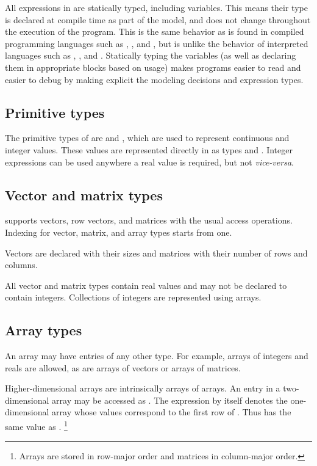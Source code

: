 \documentclass[article]{jss}
\begin{document}
All expressions in  are statically typed, including
variables.  This means their type is declared at compile time as part
of the model, and does not change throughout the execution of the
program.  This is the same behavior as is found in compiled
programming languages such as , ,
and , but is unlike the behavior of interpreted
languages such as , , and
.  Statically typing the variables (as well as
declaring them in appropriate blocks based on usage) makes
 programs easier to read and easier to debug by making
explicit the modeling decisions and expression types.

\subsection{Primitive types}

The primitive types of  are  and ,
which are used to represent continuous and integer values.  These
values are represented directly in  as types
 and .  Integer expressions can be used
anywhere a real value is required, but not {\it vice-versa}.  

\subsection{Vector and matrix types}

 supports vectors, row vectors, and matrices with the
usual access operations.  Indexing for vector, matrix, and array types
starts from one.  

Vectors are declared with their sizes and matrices with their number
of rows and columns.

All vector and matrix types contain real values and may not be
declared to contain integers.  Collections of integers are represented
using arrays.

\subsection{Array types}

An array may have entries of any other type.  For example, arrays of
integers and reals are allowed, as are arrays of vectors or arrays of
matrices.  

Higher-dimensional arrays are intrinsically arrays of arrays.  An
entry in a two-dimensional array  may be accessed as
.  The expression  by itself denotes the
one-dimensional array whose values correspond to the first row of
.  Thus  has the same value as .%
%
\footnote{Arrays are stored in row-major order and matrices in
  column-major order.}
\end{document}
